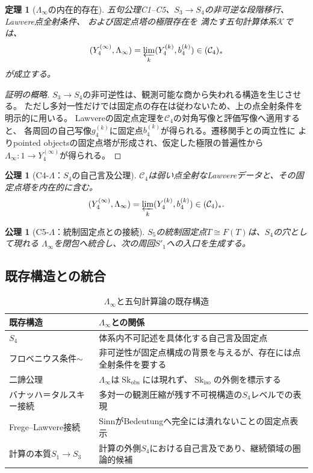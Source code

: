 \documentclass[11pt,a4paper]{ltjsarticle}
\newtheorem{theorem}[definition]{定理}
\newtheorem{axiom}[definition]{公理}
\theoremstyle{remark}
\newcommand{\LawvereInfinity}{\Lambda_\infty}
\newcommand{\Skobs}{\mathop{\mathrm{Sk}}_{\mathrm{obs}}}
\newcommand{\Skiso}{\mathop{\mathrm{Sk}}_{\mathrm{iso}}}
\begin{document}
\begin{theorem}[$\LawvereInfinity$の内在的存在]
五句公理C1--C5、$S_3\to S_4$の非可逆な段階移行、Lawvere点全射条件、
および固定点塔の極限存在を
満たす五句計算体系$\mathcal{K}$では、
\[
 (Y_4^{(\infty)},\LawvereInfinity)
 =\varprojlim_k(Y_4^{(k)},b_4^{(k)})\in(\mathcal{C}_4)_*
\]
が成立する。
\end{theorem}

\begin{proof}[証明の概略]
$S_3\to S_4$の非可逆性は、観測可能な商から失われる構造を生じさせる。
ただし多対一性だけでは固定点の存在は従わないため、上の点全射条件を明示的に用いる。
Lawvereの固定点定理を$\mathcal{C}_4$の対角写像と評価写像へ適用すると、
各周回の自己写像$g_4^{(k)}$に固定点$b_4^{(k)}$が得られる。遷移関手との両立性に
よりpointed objectsの固定点塔が形成され、仮定した極限の普遍性から
$\LawvereInfinity:1\to Y_4^{(\infty)}$が得られる。
\end{proof}

\begin{axiom}[C4-$\Lambda$：$S_4$の自己言及公理]
$\mathcal{C}_4$は弱い点全射なLawvereデータと、その固定点塔を内在的に含む。
\[
 (Y_4^{(\infty)},\LawvereInfinity)
 =\varprojlim_k(Y_4^{(k)},b_4^{(k)})\in(\mathcal{C}_4)_*.
\]
\end{axiom}

\begin{axiom}[C5-$\Lambda$：統制固定点との接続]
$S_5$の統制固定点$T\cong F(T)$は、$S_4$の穴として現れる
$\LawvereInfinity$を閉包へ統合し、次の周回$S'_1$への入口を生成する。
\end{axiom}

\subsection{既存構造との統合}

\begin{table}[htbp]
\centering
\caption{$\LawvereInfinity$と五句計算論の既存構造}
\label{tab:lambda-integration}
\small
\begin{tabularx}{\textwidth}{@{}>{\raggedright\arraybackslash}p{} >{\raggedright\arraybackslash}X@{}}
\toprule
既存構造 & $\LawvereInfinity$との関係 \\
\midrule
$S_4$ & 体系内不可記述を具体化する自己言及固定点 \\
フロベニウス条件$\sim$ & 非可逆性が固定点構成の背景を与えるが、存在には点全射条件を要する \\
二諦公理 & $\LawvereInfinity$は$\Skobs$には現れず、$\Skiso$の外側を標示する \\
バナッハ＝タルスキー接続 & 多対一の観測圧縮が残す不可視構造の$S_4$レベルでの表現 \\
Frege--Lawvere接続 & SinnがBedeutungへ完全には潰れないことの固定点表示 \\
計算の本質$S_1\to S_3$ & 計算の外側$S_4$における自己言及であり、継続領域の圏論的候補 \\
\bottomrule
\end{tabularx}
\end{table}
\end{document}

